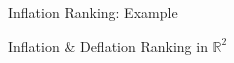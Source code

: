 \documentclass[xcolor=dvipsnames]{beamer}
\begin{document}
\begin{frame}{Inflation Ranking: Example}
\begin{figure}
\end{figure}
\end{frame}

\begin{frame}{Inflation \& Deflation Ranking in $\mathbb{R}^2$}
\begin{figure}
\end{figure}
\end{frame}
\end{document}
